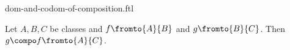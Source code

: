 \documentclass{stex}
\begin{document}
\begin{smodule}{dom-and-codom-of-composition.ftl}


\begin{proposition}[forthel,id=CompFromToProp]
  Let $A, B, C$ be classes and $f \fromto{A}{B}$ and $g \fromto{B}{C}$.
  Then $g \compo f \fromto{A}{C}$.
\end{proposition}

\end{smodule}
\end{document}
